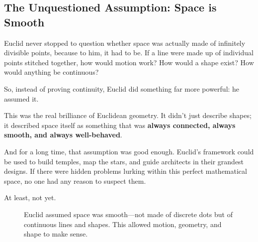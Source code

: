 \subsection{The Unquestioned Assumption: Space is Smooth}

Euclid never stopped to question whether space was actually made of infinitely divisible points, because to him, it had to be. If a line were made up of individual points stitched together, how would motion work? How would a shape exist? How would anything be continuous?

So, instead of proving continuity, Euclid did something far more powerful: he assumed it.

This was the real brilliance of Euclidean geometry. It didn’t just describe shapes; it described space itself as something that was \textbf{always connected, always smooth, and always well-behaved}.

And for a long time, that assumption was good enough. Euclid’s framework could be used to build temples, map the stars, and guide architects in their grandest designs. If there were hidden problems lurking within this perfect mathematical space, no one had any reason to suspect them.

At least, not yet.

\begin{figure}[H]
\centering
{}
\caption{Euclid assumed space was smooth—not made of discrete dots but of continuous lines and shapes. This allowed motion, geometry, and shape to make sense.}
\end{figure}

